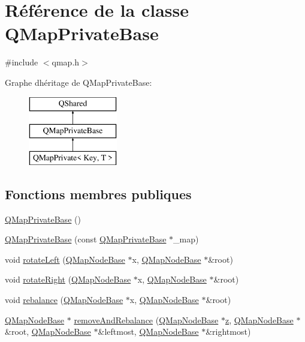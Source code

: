 \hypertarget{class_q_map_private_base}{}\section{Référence de la classe Q\+Map\+Private\+Base}
\label{class_q_map_private_base}


{\ttfamily \#include $<$qmap.\+h$>$}

Graphe d\textquotesingle{}héritage de Q\+Map\+Private\+Base\+:\begin{figure}[H]
\begin{center}
\leavevmode
\includegraphics[height=3.000000cm]{class_q_map_private_base}
\end{center}
\end{figure}
\subsection*{Fonctions membres publiques}
\begin{DoxyCompactItemize}
\item 
\hyperlink{class_q_map_private_base_ad399960b6beb787ae4ec8e9d3b0cfc67}{Q\+Map\+Private\+Base} ()
\item 
\hyperlink{class_q_map_private_base_ac204e3463e15fd14e08affde54af3eff}{Q\+Map\+Private\+Base} (const \hyperlink{class_q_map_private_base}{Q\+Map\+Private\+Base} $\ast$\+\_\+map)
\item 
void \hyperlink{class_q_map_private_base_adda5f2da31d0938d52b2d17ed8e5aac5}{rotate\+Left} (\hyperlink{struct_q_map_node_base}{Q\+Map\+Node\+Base} $\ast$x, \hyperlink{struct_q_map_node_base}{Q\+Map\+Node\+Base} $\ast$\&root)
\item 
void \hyperlink{class_q_map_private_base_a25607364c3ed27ea255a589fcb798053}{rotate\+Right} (\hyperlink{struct_q_map_node_base}{Q\+Map\+Node\+Base} $\ast$x, \hyperlink{struct_q_map_node_base}{Q\+Map\+Node\+Base} $\ast$\&root)
\item 
void \hyperlink{class_q_map_private_base_a3c74c06a129b7d4f2a7d455cf7b0b515}{rebalance} (\hyperlink{struct_q_map_node_base}{Q\+Map\+Node\+Base} $\ast$x, \hyperlink{struct_q_map_node_base}{Q\+Map\+Node\+Base} $\ast$\&root)
\item 
\hyperlink{struct_q_map_node_base}{Q\+Map\+Node\+Base} $\ast$ \hyperlink{class_q_map_private_base_a5a142ce0ac3574dec21ce5766fca12ce}{remove\+And\+Rebalance} (\hyperlink{struct_q_map_node_base}{Q\+Map\+Node\+Base} $\ast$\hyperlink{058__bracket__recursion_8tcl_a25ed1bcb423b0b7200f485fc5ff71c8e}{z}, \hyperlink{struct_q_map_node_base}{Q\+Map\+Node\+Base} $\ast$\&root, \hyperlink{struct_q_map_node_base}{Q\+Map\+Node\+Base} $\ast$\&leftmost, \hyperlink{struct_q_map_node_base}{Q\+Map\+Node\+Base} $\ast$\&rightmost)
\end{DoxyCompactItemize}
